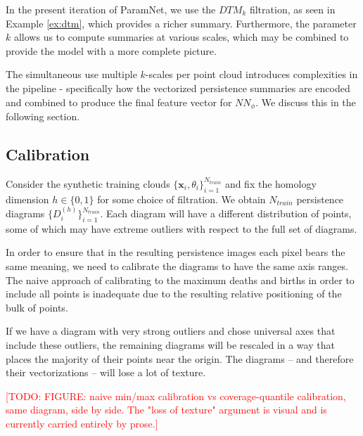 \documentclass[11pt,letterpaper]{article}
\newcommand{\1}{\mathds{1}}
\newcommand{\pc}{\mathbf{x}}
\newcommand{\todo}[1]{\textcolor{red}{[TODO: #1]}}
\newcommand{\todo}[1]{}
\theoremstyle{plain}
\theoremstyle{definitioncolon}
\begin{document}
In the present iteration of ParamNet, we use the $DTM_k$ filtration, as seen in
Example \ref{ex:dtm}, which provides a richer summary. Furthermore, the parameter
$k$ allows us to compute summaries at various scales, which may be combined to
provide the model with a more complete picture.

The simultaneous use multiple $k$-scales per point cloud introduces complexities
in the pipeline - specifically how the vectorized persistence summaries are
encoded and combined to produce the final feature vector for $NN_\phi$. We
discuss this in the following section.

\subsection{Calibration}
\label{ssec:calibration}
Consider the synthetic training clouds $\{\pc_i, \theta_i\}_{i=1}^{N_{train}}$
and fix the homology dimension $h \in \{0,1\}$ for some choice of filtration. We
obtain $N_{train}$ persistence diagrams $\{D^{(h)}_i\}_{i=1}^{N_{train}}$. Each
diagram will have a different distribution of points, some of which may have
extreme outliers with respect to the full set of diagrams.

In order to ensure that in the resulting persistence images each pixel bears the
same meaning, we need to calibrate the diagrams to have the same axis ranges. The
naive approach of calibrating to the maximum deaths and births in order to
include all points is inadequate due to the resulting relative positioning of the
bulk of points.

If we have a diagram with very strong outliers and chose universal axes that
include these outliers, the remaining diagrams will be rescaled in a way that
places the majority of their points near the origin. The diagrams -- and
therefore their vectorizations -- will lose a lot of texture.

\todo{FIGURE: naive min/max calibration vs coverage-quantile calibration, same
diagram, side by side. The "loss of texture" argument is visual and is currently
carried entirely by prose.}
\end{document}
